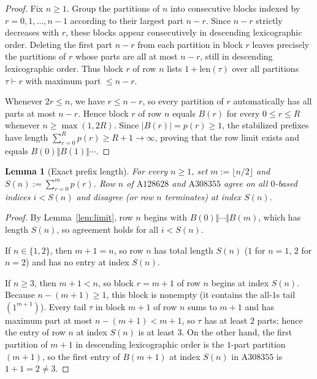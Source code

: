 \documentclass[11pt]{article}
\newtheorem{lemma}[theorem]{Lemma}
\begin{document}
\begin{proof}
Fix $n \ge 1$. Group the partitions of $n$ into consecutive blocks indexed by $r = 0, 1, \dots, n-1$ according to their largest part $n - r$. Since $n - r$ strictly decreases with $r$, these blocks appear consecutively in descending lexicographic order. Deleting the first part $n - r$ from each partition in block $r$ leaves precisely the partitions of $r$ whose parts are all at most $n - r$, still in descending lexicographic order. Thus block $r$ of row $n$ lists $1 + \mathrm{len}(\tau)$ over all partitions $\tau \vdash r$ with maximum part $\le n - r$.

Whenever $2r \le n$, we have $r \le n - r$, so every partition of $r$ automatically has all parts at most $n - r$. Hence block $r$ of row $n$ equals $B(r)$ for every $0 \le r \le R$ whenever $n \ge \max(1, 2R)$. Since $|B(r)| = p(r) \ge 1$, the stabilized prefixes have length $\sum_{r=0}^R p(r) \ge R + 1 \to \infty$, proving that the row limit exists and equals $B(0) \Vert B(1) \Vert \cdots$.
\end{proof}

\begin{lemma}[Exact prefix length]\label{lem:prefix}
For every $n \ge 1$, set $m := \lfloor n/2 \rfloor$ and $S(n) := \sum_{r=0}^m p(r)$. Row $n$ of $\mathrm{A128628}$ and $\mathrm{A308355}$ agree on all $0$-based indices $i < S(n)$ and disagree (or row $n$ terminates) at index $S(n)$.
\end{lemma}

\begin{proof}
By Lemma~\ref{lem:limit}, row $n$ begins with $B(0) \Vert \cdots \Vert B(m)$, which has length $S(n)$, so agreement holds for all $i < S(n)$.

If $n \in \{1, 2\}$, then $m + 1 = n$, so row $n$ has total length $S(n)$ ($1$ for $n=1$, $2$ for $n=2$) and has no entry at index $S(n)$.

If $n \ge 3$, then $m + 1 < n$, so block $r = m + 1$ of row $n$ begins at index $S(n)$. Because $n - (m+1) \ge 1$, this block is nonempty (it contains the all-$1$s tail $(1^{m+1})$). Every tail $\tau$ in block $m+1$ of row $n$ sums to $m+1$ and has maximum part at most $n - (m+1) < m+1$, so $\tau$ has at least $2$ parts; hence the entry of row $n$ at index $S(n)$ is at least $3$. On the other hand, the first partition of $m+1$ in descending lexicographic order is the $1$-part partition $(m+1)$, so the first entry of $B(m+1)$ at index $S(n)$ in $\mathrm{A308355}$ is $1 + 1 = 2 \ne 3$.
\end{proof}
\end{document}
